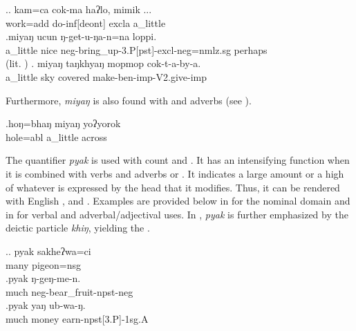 \ex.\ag. kam=ca cok-ma     haʔlo, mimik ... \\
work{\sc =add} do{\sc -inf[deont]} {\sc excla} a\_little  \\
  
\bg.miyaŋ ucun ŋ-get-u-ŋa-n=na         loppi.\\
a\_little nice {\sc neg-}bring\_up{\sc -3.P[pst]-excl-neg=nmlz.sg} perhaps\\
 (lit. )  
 \bg. miyaŋ taŋkhyaŋ mopmop  cok-t-a-by-a.\\
a\_little  sky covered make{\sc -ben-imp-V2.give-imp}\\
  

 Furthermore, \emph{miyaŋ} is also found with  and  adverbs (see \Next).
 
\largerpage

 \exg.hoŋ=bhaŋ   miyaŋ yoʔyorok\\
 hole{\sc =abl} a\_little across\\
  

The quantifier \emph{pyak} is used with count and . It has an intensifying function when it is combined with verbs and adverbs or . It indicates a large amount or a high  of whatever is expressed by the head that it modifies. Thus, it can be rendered with  English ,  and . Examples are provided below in \Next for the nominal domain and in \NNext for verbal and adverbal/adjectival uses. In \NNext[a], \emph{pyak} is further emphasized by the deictic  particle \emph{khiŋ}, yielding the  .

\ex.\ag. pyak  sakheʔwa=ci\\
many pigeon{\sc =nsg}\\
 
\bg.pyak  ŋ-geŋ-me-n.\\
much {\sc neg-}bear\_fruit{\sc [3sg]-npst-neg}\\
  
\bg.pyak  yaŋ  ub-wa-ŋ.\\
much money earn{\sc -npst[3.P]-1sg.A} \\
  

